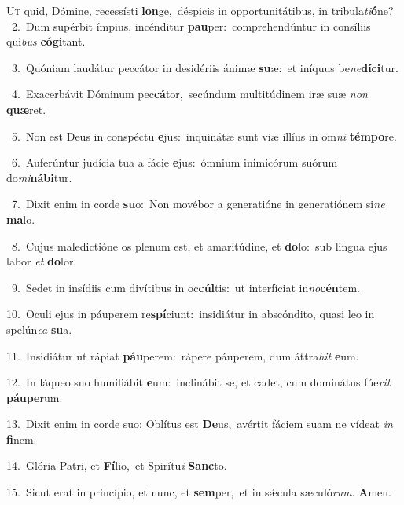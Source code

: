 \lettrine{\initial\textcolor{\initialcolor}{U}}{t} quid, Dómine, recessísti \textbf{lon}\-ge,~\star déspicis in opportunitátibus, in tribula\-\textit{ti}\-\textbf{ó}ne?\\
{\numbfont\textcolor{\numbcolor}{~2.}}~Dum supérbit ímpius, incénditur \textbf{pau}\-per:~\star comprehendúntur in consíliis qui\textit{bus} \textbf{có}\-\textbf{gi}tant.\par
{\numbfont\textcolor{\numbcolor}{~3.}}~Quóniam laudátur peccátor in desidériis ánimæ \textbf{su}\-æ:~\star et iníquus be\-\textit{ne}\-\textbf{dí}\textbf{ci}tur.\par
{\numbfont\textcolor{\numbcolor}{~4.}}~Exacerbávit Dóminum pec\-\textbf{cá}\-tor,~\star secúndum multitúdinem iræ suæ \textit{non} \textbf{quæ}\-ret.\par
{\numbfont\textcolor{\numbcolor}{~5.}}~Non est Deus in conspéctu \textbf{e}\-jus:~\star inquinátæ sunt viæ illíus in om\textit{ni} \textbf{tém}\-\textbf{po}re.\par
{\numbfont\textcolor{\numbcolor}{~6.}}~Auferúntur judícia tua a fácie \textbf{e}\-jus:~\star ómnium inimicórum suórum do\-\textit{mi}\-\textbf{ná}\textbf{bi}tur.\par
{\numbfont\textcolor{\numbcolor}{~7.}}~Dixit enim in corde \textbf{su}\-o:~\star Non movébor a generatióne in generatiónem si\textit{ne} \textbf{ma}\-lo.\par
{\numbfont\textcolor{\numbcolor}{~8.}}~Cujus maledictióne os plenum est, et amaritúdine, et \textbf{do}\-lo:~\star sub lingua ejus labor \textit{et} \textbf{do}\-lor.\par
{\numbfont\textcolor{\numbcolor}{~9.}}~Sedet in insídiis cum divítibus in oc\-\textbf{cúl}\-tis:~\star ut interfíciat in\-\textit{no}\-\textbf{cén}tem.\par
{\numbfont\textcolor{\numbcolor}{10.}}~Oculi ejus in páuperem re\-\textbf{spí}\-ciunt:~\star insidiátur in abscóndito, quasi leo in spelún\textit{ca} \textbf{su}\-a.\par
{\numbfont\textcolor{\numbcolor}{11.}}~Insidiátur ut rápiat \textbf{páu}\-perem:~\star rápere páuperem, dum áttra\textit{hit} \textbf{e}\-um.\par
{\numbfont\textcolor{\numbcolor}{12.}}~In láqueo suo humiliábit \textbf{e}\-um:~\star inclinábit se, et cadet, cum dominátus fúe\textit{rit} \textbf{páu}\-\textbf{pe}rum.\par
{\numbfont\textcolor{\numbcolor}{13.}}~Dixit enim in corde suo: Oblítus est \textbf{De}\-us,~\star avértit fáciem suam ne vídeat \textit{in} \textbf{fi}\-nem.\par
{\numbfont\textcolor{\numbcolor}{14.}}~Glória Patri, et \textbf{Fí}\-lio,~\star et Spirítu\textit{i} \textbf{Sanc}\-to.\par
{\numbfont\textcolor{\numbcolor}{15.}}~Sicut erat in princípio, et nunc, et \textbf{sem}\-per,~\star et in sǽcula sæculó\-\textit{rum}\-. \textbf{A}\-men.\par
